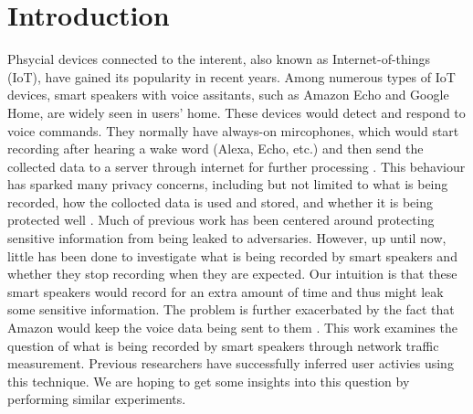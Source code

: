 \section{Introduction}
Phsycial devices connected to the interent, also known as Internet-of-things (IoT), have gained its popularity in recent years. Among numerous types of IoT devices, smart speakers with voice assitants, such as Amazon Echo and Google Home, are widely seen in users' home. These devices would detect and respond to voice commands. They normally have always-on mircophones, which would start recording after hearing a wake word (Alexa, Echo, etc.) and then send the collected data to a server through internet for further processing \cite{AmazonEc68:online}. This behaviour has sparked many privacy concerns, including but not limited to what is being recorded, how the collocted data is used and stored, and whether it is being protected well \cite{lau2018alexa, fowler_2019, apthorpe2017smart, apthorpe2019keeping, apthorpe2017spying}. Much of previous work has been centered around protecting sensitive information from being leaked to adversaries\cite{apthorpe2017smart, apthorpe2019keeping, apthorpe2017spying}. However, up until now, little has been done to investigate what is being recorded by smart speakers and whether they stop recording when they are expected. Our intuition is that these smart speakers would record for an extra amount of time and thus might leak some sensitive information. The problem is further exacerbated by the fact that Amazon would keep the voice data being sent to them \cite{kelly_statt_2019, osborne_2019}. This work examines the question of what is being recorded by smart speakers through network traffic measurement. Previous researchers \cite{apthorpe2017spying} have successfully inferred user activies using this technique. We are hoping to get some insights into this question by performing similar experiments.